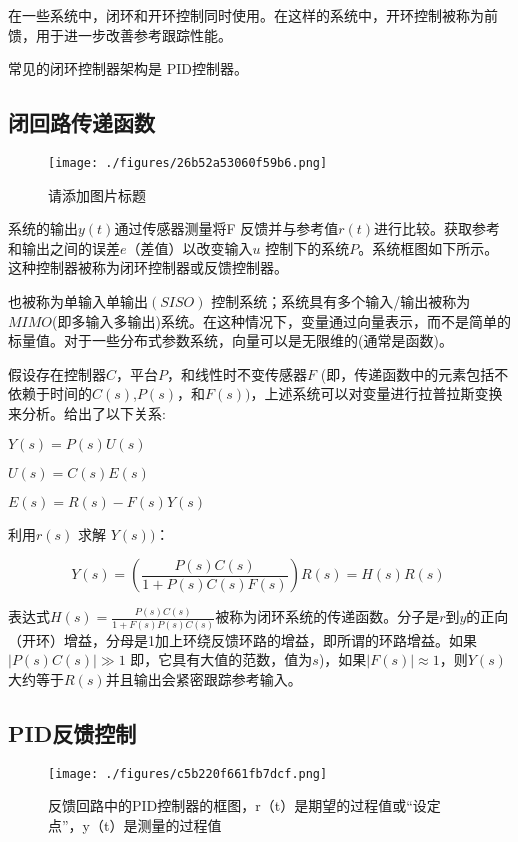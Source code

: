 在一些系统中，闭环和开环控制同时使用。在这样的系统中，开环控制被称为前馈，用于进一步改善参考跟踪性能。

常见的闭环控制器架构是 PID控制器。

\subsection{闭回路传递函数}

\begin{figure}[ht]
\centering
\texttt{[image: ./figures/26b52a53060f59b6.png]}
\caption{请添加图片标题} \label{fig_KZLL_2}
\end{figure}

系统的输出$y(t)$通过传感器测量将F 反馈并与参考值$r(t)$进行比较。获取参考和输出之间的误差$e$（差值）以改变输入$u$ 控制下的系统$P$。系统框图如下所示。这种控制器被称为闭环控制器或反馈控制器。

也被称为单输入单输出$(SISO)$ 控制系统；系统具有多个输入/输出被称为$MIMO$(即多输入多输出)系统。在这种情况下，变量通过向量表示，而不是简单的标量值。对于一些分布式参数系统，向量可以是无限维的(通常是函数)。

假设存在控制器$C$，平台$P$，和线性时不变传感器$F$ (即，传递函数中的元素包括不依赖于时间的$C(s)$,$P(s)$，和$F(s))$，上述系统可以对变量进行拉普拉斯变换来分析。给出了以下关系:

$Y(s)=P(s)U(s)$

$U(s)=C(s)E(s)$

$E(s)=R(s)-F(s)Y(s)$

利用$r(s )$ 求解 $Y(s) )$：

\begin{equation}
Y(s) = \left( \frac{P(s)C(s)}{1 + P(s)C(s)F(s)} \right) R(s) = H(s)R(s)~
\end{equation}

表达式$H(s) = \frac{P(s)C(s)}{1 + F(s)P(s)C(s)}$被称为闭环系统的传递函数。分子是$r$到$y$的正向（开环）增益，分母是1加上环绕反馈环路的增益，即所谓的环路增益。如果$\left| P(s)C(s) \right| \gg 1$ 即，它具有大值的范数，值为$s$)，如果$\left| F(s) \right| \approx 1$，则$Y(s)$大约等于$R(s)$并且输出会紧密跟踪参考输入。

\subsection{PID反馈控制}

\begin{figure}[ht]
\centering
\texttt{[image: ./figures/c5b220f661fb7dcf.png]}
\caption{反馈回路中的PID控制器的框图，r（t）是期望的过程值或“设定点”，y（t）是测量的过程值} \label{fig_KZLL_1}
\end{figure}

